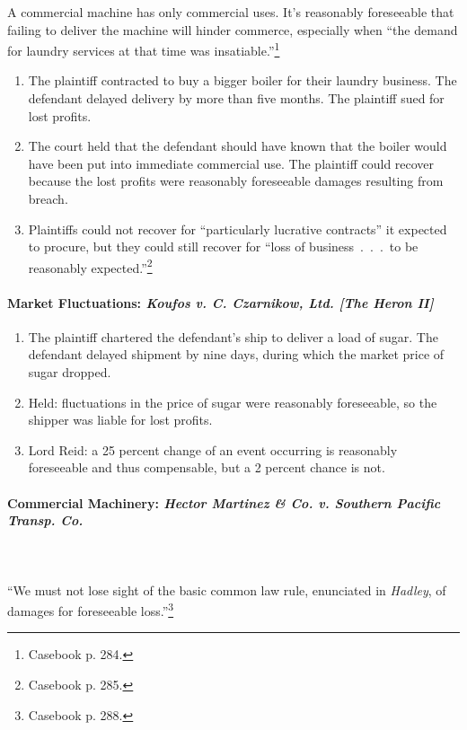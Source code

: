 A commercial machine has only commercial uses. It's reasonably foreseeable 
that failing to deliver the machine will hinder commerce, especially when 
``the demand for laundry services at that time was 
insatiable.''\footnote{Casebook p. 284.}

\begin{enumerate}
    \item The plaintiff contracted to buy a bigger boiler for their laundry 
    business. The defendant delayed delivery by more than five months. The 
    plaintiff sued for lost profits.
    \item The court held that the defendant should have known that the boiler 
    would have been put into immediate commercial use. The plaintiff could 
    recover because the lost profits were reasonably foreseeable damages 
    resulting from breach.
    \item Plaintiffs could not recover for ``particularly lucrative 
    contracts'' it expected to procure, but they could still recover for 
    ``loss of business~.~.~.~to be reasonably expected.''\footnote{Casebook p. 
    285.}
\end{enumerate}

\paragraph{Market Fluctuations: \emph{Koufos v. C. Czarnikow, Ltd. [The Heron 
II]}}

\begin{enumerate}
    \item The plaintiff chartered the defendant's ship to deliver a load of 
    sugar. The defendant delayed shipment by nine days, during which the 
    market price of sugar dropped.
    \item Held: fluctuations in the price of sugar were reasonably 
    foreseeable, so the shipper was liable for lost profits.
    \item Lord Reid: a 25 percent change of an event occurring is reasonably 
    foreseeable and thus compensable, but a 2 percent chance is not.
\end{enumerate}

\paragraph{Commercial Machinery: \emph{Hector Martinez \& Co. v. Southern 
Pacific Transp. Co.}}
~\\\\
``We must not lose sight of the basic common law rule, enunciated in 
\emph{Hadley}, of damages for foreseeable loss.''\footnote{Casebook p. 288.}

